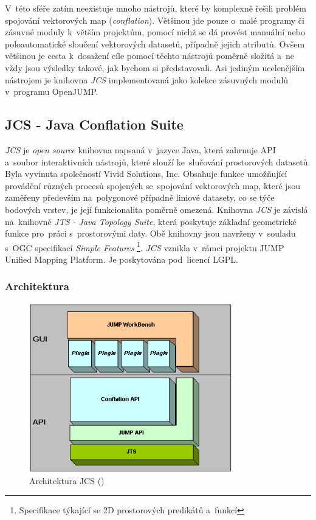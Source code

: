 V~této sféře zatím neexistuje mnoho nástrojů, které by komplexně řešili problém
spojování vektorových map (\textit{conflation}). Většinou jde pouze o~malé 
programy či zásuvné moduly k~větším projektům, pomocí nichž se dá provést manuální
nebo poloautomatické sloučení vektorových datasetů, případně jejich atributů. 
Ovšem většinou je cesta k~dosažení cíle pomocí těchto nástrojů poměrně složitá 
a~ne vždy jsou výsledky takové, jak bychom si představovali. Asi jediným 
ucelenějším nástrojem je knihovna \textit{JCS} implementovaná jako kolekce 
zásuvných modulů v~programu OpenJUMP.

\subsection{JCS - Java Conflation Suite}
\label{JCS}

\textit{JCS} je \textit{open source} knihovna napsaná v~jazyce Java, která 
zahrnuje API a~soubor interaktivních nástrojů, které slouží ke~slučování 
prostorových datasetů. Byla vyvinuta společností Vivid Solutions, Inc. 
Obsahuje funkce umožňující provádění různých procesů spojených se~spojování
vektorových map, které jsou zaměřeny především na~polygonové případně liniové
datasety, co se týče bodových vrstev, je její funkcionalita poměrně omezená. 
Knihovna \textit{JCS} je závislá na~knihovně \textit{JTS - Java Topology Suite},
která poskytuje základní geometrické funkce pro~práci s~prostorovými
daty. Obě knihovny jsou navrženy v~souladu s~OGC specifikací 
\textit{Simple Features} \footnote{Specifikace týkající se 2D prostorových 
predikátů a~funkcí}. \textit{JCS} vznikla v~rámci projektu JUMP Unified 
Mapping Platform. Je poskytována pod~licencí LGPL.

\subsubsection{Architektura}
\label{jcspic}
  \begin{figure}[hbt]
    \centering
      \includegraphics[width=250pt]{./pictures/JCS_Architecture.png}
      \caption{Architektura JCS 
	  ()}
      \label{fig:architektura}
  \end{figure}


